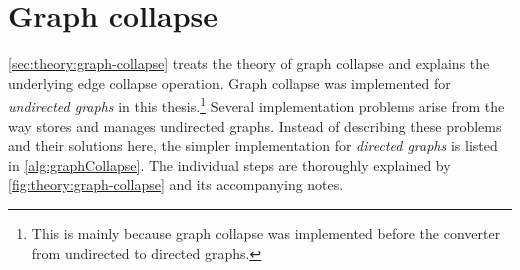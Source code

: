 %
%




\section{Graph collapse}
\label{sec:impl:graph-collapse}

\autoref{sec:theory:graph-collapse} treats the theory of graph collapse and explains the underlying edge collapse operation. %
Graph collapse was implemented for \emph{undirected graphs} in this thesis.\footnote{This is mainly because graph collapse was implemented before the converter from undirected to directed graphs.} Several implementation problems arise from the way \vtk stores and manages undirected graphs.
Instead of describing these problems and their solutions here, the simpler implementation for \emph{directed graphs} is listed in \autoref{alg:graphCollapse}. The individual steps are thoroughly explained by \autoref{fig:theory:graph-collapse} and its accompanying notes.

